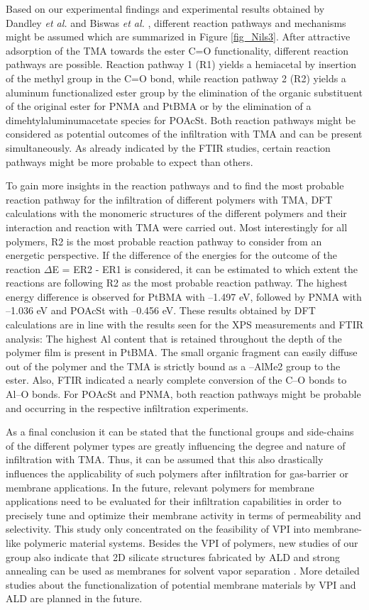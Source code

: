 \documentclass[AMA,STIX2COL]{WileyNJD-v2} %
\begin{document}
Based on our experimental findings and experimental results obtained by Dandley \textit{et al.} and Biswas \textit{et al.} \cite{Dandley.2014, Biswas.2014}, different reaction pathways and mechanisms might be assumed which are summarized in Figure \ref{fig_Nils3}. After attractive adsorption of the TMA towards the ester C=O functionality, different reaction pathways are possible. Reaction pathway 1 (R1) yields a hemiacetal by insertion of the methyl group in the C=O bond, while reaction pathway 2 (R2) yields a aluminum functionalized ester group by the elimination of the organic substituent of the original ester for PNMA and PtBMA or by the elimination of a dimehtylaluminumacetate species for POAcSt. Both reaction pathways might be considered as potential outcomes of the infiltration with TMA and can be present simultaneously. As already indicated by the FTIR studies, certain reaction pathways might be more probable to expect than others.

To gain more insights in the reaction pathways and to find the most probable reaction pathway for the infiltration of different polymers with TMA, DFT calculations with the monomeric structures of the different polymers and their interaction and reaction with TMA were carried out. Most interestingly for all polymers, R2 is the most probable reaction pathway to consider from an energetic perspective. If the difference of the energies for the outcome of the reaction $\Delta$E = ER2 - ER1 is considered, it can be estimated to which extent the reactions are following R2 as the most probable reaction pathway. The highest energy difference is observed for PtBMA with –1.497 eV, followed by PNMA with –1.036 eV and POAcSt with –0.456 eV. These results obtained by DFT calculations are in line with the results seen for the XPS measurements and FTIR analysis: The highest Al content that is retained throughout the depth of the polymer film is present in PtBMA. The small organic fragment can easily diffuse out of the polymer and the TMA is strictly bound as a –AlMe2 group to the ester. Also, FTIR indicated a nearly complete conversion of the C–O bonds to Al–O bonds. For POAcSt and PNMA, both reaction pathways might be probable and occurring in the respective infiltration experiments.

As a final conclusion it can be stated that the functional groups and side-chains of the different polymer types are greatly influencing the degree and nature of infiltration with TMA. Thus, it can be assumed that this also drastically influences the applicability of such polymers after infiltration for gas-barrier or membrane applications. In the future, relevant polymers for membrane applications need to be evaluated for their infiltration capabilities in order to precisely tune and optimize their membrane activity in terms of permeability and selectivity. This study only concentrated on the feasibility of VPI into membrane-like polymeric material systems. Besides the VPI of polymers, new studies of our group also indicate that 2D silicate structures fabricated by ALD and strong annealing can be used as membranes for solvent vapor separation \cite{Dementyev.2023, Naberezhnyi.2022}. More detailed studies about the functionalization of potential membrane materials by VPI and ALD are planned in the future.
\end{document}
